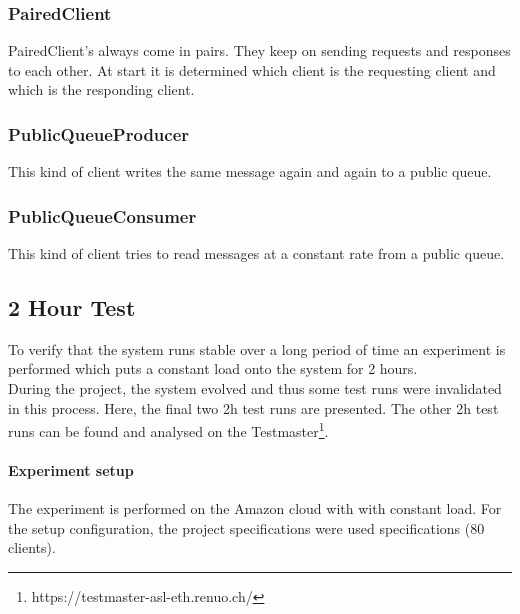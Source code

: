 \documentclass[milestone1.tex]{subfiles}
\begin{document}
\subsubsection{PairedClient}
PairedClient's always come in pairs. They keep on sending requests and responses to each other. At start it is determined which client is the requesting client and which is the responding client.

\subsubsection{PublicQueueProducer}
This kind of client writes the same message again and again to a public queue.

\subsubsection{PublicQueueConsumer}
This kind of client tries to read messages at a constant rate from a public queue.

\subsection{2 Hour Test}



To verify that the system runs stable over a long period of time an experiment is performed which puts a constant load onto the system for 2 hours.\\

During the project, the system evolved and thus some test runs were invalidated in this process. Here, the final two 2h test runs are presented. The other 2h test runs can be found and analysed on the Testmaster\footnote{https://testmaster-asl-eth.renuo.ch/}.\\

\paragraph{Experiment setup}
The experiment is performed on the Amazon cloud with with constant load. For the setup configuration, the project specifications were used specifications (80 clients).\\
\end{document}
